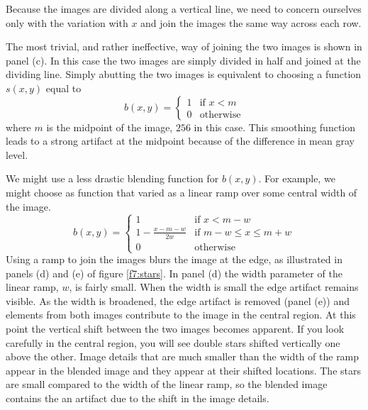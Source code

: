 Because the images are divided along a vertical line, we need to
concern ourselves only with the variation with $x$ and join the images
the same way across each row.

The most trivial, and rather ineffective, way of joining the two
images is shown in panel (c).  In this case the two images are simply
divided in half and joined at the dividing line.  Simply abutting the
two images is equivalent to choosing a function $s(x,y)$ equal to
\begin{equation}
b(x,y) = 
  \left \{ 
    \begin{array}{ll}
     1 & \mbox{if $x < m$} \\
     0 & \mbox{otherwise}
    \end{array}
  \right.
\end{equation}
where $m$ is the midpoint of the image, $256$ in this case.  This
smoothing function leads to a strong artifact at the midpoint because
of the difference in mean gray level.

We might use a less drastic blending function for $b(x,y)$.  For
example, we might choose as function that varied as a linear ramp over
some central width of the image.
\begin{equation}
\label{e6:ramp}
b(x,y) = 
  \left \{ 
    \begin{array}{ll}
     {1 } & \mbox{if $x < m - w $} \\
     {1 - \frac{x - m - w }{2w}} & \mbox{if $m - w \leq x \leq m + w$} \\
     0 & \mbox{otherwise}
    \end{array}
  \right.
\end{equation}
Using a ramp to join the images blurs the image at the edge, as
illustrated in panels (d) and (e) of figure \ref{f7:stars}.  In panel
(d) the width parameter of the linear ramp, $w$, is fairly small.
When the width is small the edge artifact remains visible.  As the
width is broadened, the edge artifact is removed (panel (e)) and
elements from both images contribute to the image in the central
region.  At this point the vertical shift between the two images
becomes apparent.  If you look carefully in the central region, you
will see double stars shifted vertically one above the other.  Image
details that are much smaller than the width of the ramp appear in the
blended image and they appear at their shifted locations.  The stars
are small compared to the width of the linear ramp, so the blended
image contains the an artifact due to the shift in the image details.

